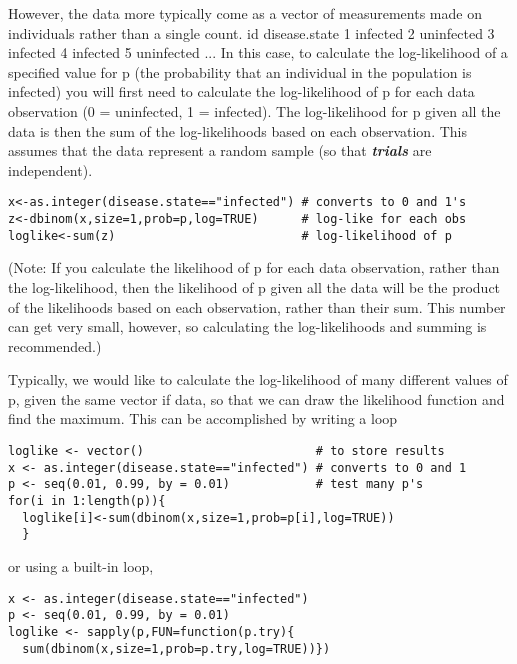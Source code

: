 \documentclass[12pt, a4paper]{article}
\theoremstyle{plain}
\theoremstyle{definition}
\theoremstyle{remark}
\begin{document}
However, the data more typically come as a vector of measurements made on individuals rather than a single count.
id disease.state
1 infected
2 uninfected
3 infected
4 infected
5 uninfected
...
In this case, to calculate the log-likelihood of a specified value for p (the probability that an individual in the population is infected) you will first need to calculate the log-likelihood of p for each data observation (0 = uninfected, 1 = infected). The log-likelihood for p given all the data is then the sum of the log-likelihoods based on each observation. This assumes that the data represent a random sample (so that \textbf{\textit{trials}} are independent).

\begin{framed}
\begin{verbatim}
x<-as.integer(disease.state=="infected") # converts to 0 and 1's
z<-dbinom(x,size=1,prob=p,log=TRUE)      # log-like for each obs
loglike<-sum(z)                          # log-likelihood of p
\end{verbatim}
\end{framed}

(Note: If you calculate the likelihood of p for each data observation, rather than the log-likelihood, then the likelihood of p given all the data will be the product of the likelihoods based on each observation, rather than their sum. This number can get very small, however, so calculating the log-likelihoods and summing is recommended.)

Typically, we would like to calculate the log-likelihood of many different values of p, given the same vector if data, so that we can draw the likelihood function and find the maximum. This can be accomplished by writing a loop
\begin{framed}
\begin{verbatim}
loglike <- vector()                        # to store results
x <- as.integer(disease.state=="infected") # converts to 0 and 1
p <- seq(0.01, 0.99, by = 0.01)            # test many p's
for(i in 1:length(p)){
  loglike[i]<-sum(dbinom(x,size=1,prob=p[i],log=TRUE))
  }
\end{verbatim}
\end{framed}

or using a built-in loop,
\begin{framed}
\begin{verbatim}
x <- as.integer(disease.state=="infected")
p <- seq(0.01, 0.99, by = 0.01)
loglike <- sapply(p,FUN=function(p.try){
  sum(dbinom(x,size=1,prob=p.try,log=TRUE))})
\end{verbatim}
\end{framed}
\newpage
\end{document}

